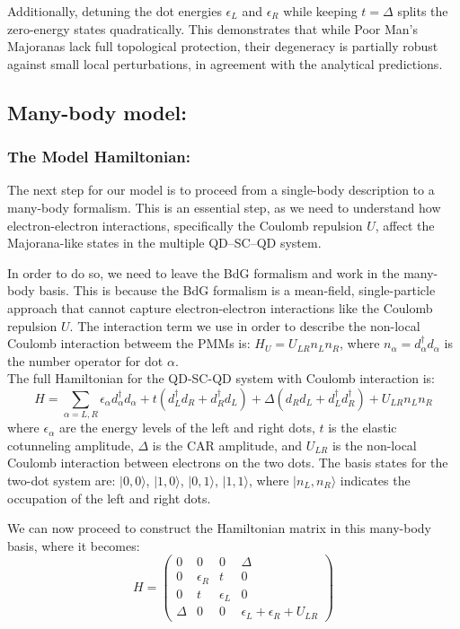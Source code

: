 \documentclass[11pt, letterpaper, titlepage]{article}
\begin{document}
Additionally, detuning the dot energies $\epsilon_L$ and $\epsilon_R$ while keeping $t = \Delta$ splits the zero-energy states quadratically. This demonstrates that while Poor Man’s Majoranas lack full topological protection, their degeneracy is partially robust against small local perturbations, in agreement with the analytical predictions.
\newpage
\subsection{Many-body model:}
\subsubsection{The Model Hamiltonian:} 
The next step for our model is to proceed from a single-body description to a many-body formalism. This is an essential step, as we need to understand how electron-electron interactions, specifically the Coulomb repulsion $U$, affect the Majorana-like states in the multiple QD–SC–QD system. \par
In order to do so, we need to leave the BdG formalism and work in the many-body basis. This is because the BdG formalism is a mean-field, single-particle approach that cannot capture electron-electron interactions like the Coulomb repulsion $U$. The interaction term we use in order to describe the non-local Coulomb interaction betweem the PMMs is: $H_U=U_{LR}n_Ln_R$, where $n_{α}=d_{α}^{†}d_{α}$ is the number operator for dot $α$.\\
The full Hamiltonian for the QD-SC-QD system with Coulomb interaction is:
$$
H = ∑_{α=L,R} ϵ_{α} d_{α}^{†}d_{α} + t (d_L^{†} d_R + d_R^{†} d_L) + Δ (d_R d_L + d_L^{†} d_R^{†})  + U_{LR} n_L n_R
$$
where $ϵ_{α}$ are the energy levels of the left and right dots, $t$ is the elastic cotunneling amplitude, $Δ$ is the CAR amplitude, and $U_{LR}$ is the non-local Coulomb interaction between electrons on the two dots. The basis states for the two-dot system are: $|0,0⟩$, $|1,0⟩$, $|0,1⟩$, $|1,1⟩$, where $|n_L,n_R⟩$ indicates the occupation of the left and right dots.\par
We can now proceed to construct the Hamiltonian matrix in this many-body basis, where it becomes:
\begin{equation}
H = \begin{pmatrix}
0 & 0 & 0 & Δ \\
0 & ϵ_R & t & 0 \\
0 & t & ϵ_L & 0 \\
Δ & 0 & 0 & ϵ_L + ϵ_R + U_{LR}
\end{pmatrix}
\label{eq:mbHamiltonian}
\end{equation}
\end{document}

